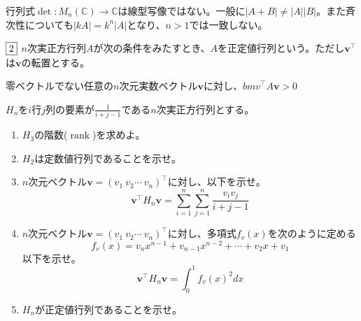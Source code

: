 \documentclass[dvipdfmx]{jsreport}
\newcommand{\C}{\mathbb{C}}
\DeclareMathOperator{\rank}{rank}
\newcommand{\tr}[1]{{#1}^\intercal}
\newcounter{num}[section]
\begin{document}
\begin{answer}
\begin{enumerate}
\begin{enumerate_alpha}
	\item 行列式$\det{}\colon M_n(\C)\to \C$は線型写像ではない。一般に$|A+ B|\ne |A||B|$。また斉次性についても$|kA|= k^n|A|$となり、$n> 1$では一致しない。
\end{enumerate_alpha}
\end{enumerate}
\end{answer}

\begin{tcolorbox} %
	$\fbox{2}$ $n$次実正方行列$A$が次の条件をみたすとき、$A$を正定値行列という。ただし$\tr{\bm{v}}$は$\bm{v}$の転置とする。
\begin{tcolorbox}
	零ベクトルでない任意の$n$次元実数ベクトル$\bm{v}$に対し、$\tr{bm{v}} A\bm{v}> 0$
\end{tcolorbox}
	$H_n$を$i$行$j$列の要素が$\frac{1}{i+ j- 1}$である$n$次実正方行列とする。
\begin{enumerate}
	\item $H_3$の階数($\rank{}$)を求めよ。
	\item $H_2$は定数値行列であることを示せ。
	\item $n$次元ベクトル$\bm{v}= \tr{(v_1\ v_2\cdots\ v_n)}$に対し、以下を示せ。
\begin{equation*}
	\tr{\bm{v}} H_n\bm{v}= \sum_{i= 1}^n\sum_{j= 1}^n \frac{v_i v_j}{i+ j-1}
\end{equation*}
	\item $n$次元ベクトル$\bm{v}= \tr{(v_1\ v_2\cdots\ v_n)}$に対し、多項式$f_v(x)$を次のように定める
\begin{equation*}
	f_v(x)= v_n x^{n-1}+ v_{n- 1} x^{n- 2}+ \cdots+ v_2 x+ v_1
\end{equation*}
	以下を示せ。
\begin{equation*}
	\tr{\bm{v}} H_n\bm{v}= \int_0^1 {f_v(x)}^2 dx
\end{equation*}
	\item $H_n$が正定値行列であることを示せ。
\end{enumerate}
\end{tcolorbox}
\end{document}
